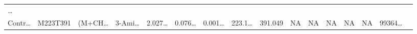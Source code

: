 \documentclass[
]{article}
\begin{document}
\begin{longtable}[]{@{}llllllllllllllll@{}}
\begin{minipage}[t]{0.02\columnwidth}
\ldots{}\strut
\end{minipage}\tabularnewline
\begin{minipage}[t]{0.04\columnwidth}\raggedright
Contr\ldots{}\strut
\end{minipage} & \begin{minipage}[t]{0.04\columnwidth}\raggedright
M223T391\strut
\end{minipage} & \begin{minipage}[t]{0.04\columnwidth}\raggedright
(M+CH\ldots{}\strut
\end{minipage} & \begin{minipage}[t]{0.04\columnwidth}\raggedright
3-Ami\ldots{}\strut
\end{minipage} & \begin{minipage}[t]{0.04\columnwidth}\raggedright
2.027\ldots{}\strut
\end{minipage} & \begin{minipage}[t]{0.04\columnwidth}\raggedright
0.076\ldots{}\strut
\end{minipage} & \begin{minipage}[t]{0.04\columnwidth}\raggedright
0.001\ldots{}\strut
\end{minipage} & \begin{minipage}[t]{0.04\columnwidth}\raggedright
223.1\ldots{}\strut
\end{minipage} & \begin{minipage}[t]{0.04\columnwidth}\raggedright
391.049\strut
\end{minipage} & \begin{minipage}[t]{0.04\columnwidth}\raggedright
NA\strut
\end{minipage} & \begin{minipage}[t]{0.03\columnwidth}\raggedright
NA\strut
\end{minipage} & \begin{minipage}[t]{0.04\columnwidth}\raggedright
NA\strut
\end{minipage} & \begin{minipage}[t]{0.04\columnwidth}\raggedright
NA\strut
\end{minipage} & \begin{minipage}[t]{0.04\columnwidth}\raggedright
NA\strut
\end{minipage} & \begin{minipage}[t]{0.04\columnwidth}\raggedright
99364\ldots{}\strut
\end{minipage} & \begin{minipage}[t]{0.02\columnwidth}\raggedright

\end{minipage}
\end{longtable}
\end{document}
